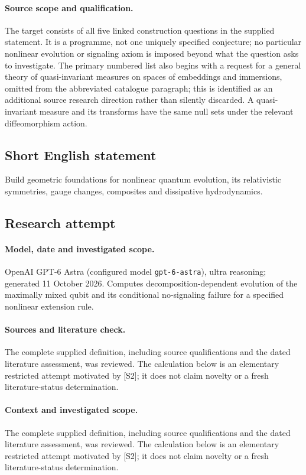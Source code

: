 \documentclass[11pt]{article}
\begin{document}
\paragraph{Source scope and qualification.}
The target consists of all five linked construction questions in the supplied statement. It is a programme, not one uniquely specified conjecture; no particular nonlinear evolution or signaling axiom is imposed beyond what the question asks to investigate. The primary numbered list also begins with a request for a general theory of quasi-invariant measures on spaces of embeddings and immersions, omitted from the abbreviated catalogue paragraph; this is identified as an additional source research direction rather than silently discarded. A quasi-invariant measure and its transforms have the same null sets under the relevant diffeomorphism action.
\subsection{Short English statement}
Build geometric foundations for nonlinear quantum evolution, its relativistic symmetries, gauge changes, composites and dissipative hydrodynamics.
\subsection{Research attempt}
\paragraph{Model, date and investigated scope.}
OpenAI GPT-6 Astra (configured model \texttt{gpt-6-astra}), ultra reasoning; generated 11 October 2026. Computes decomposition-dependent evolution of the maximally mixed qubit and its conditional no-signaling failure for a specified nonlinear extension rule.

\paragraph{Sources and literature check.}
The complete supplied definition, including source qualifications and the dated literature assessment, was reviewed. The calculation below is an elementary restricted attempt motivated by [S2]; it does not claim novelty or a fresh literature-status determination.

\paragraph{Context and investigated scope.} The complete supplied definition, including source qualifications and the dated literature assessment, was reviewed. The calculation below is an elementary restricted attempt motivated by [S2]; it does not claim novelty or a fresh literature-status determination.
\end{document}
